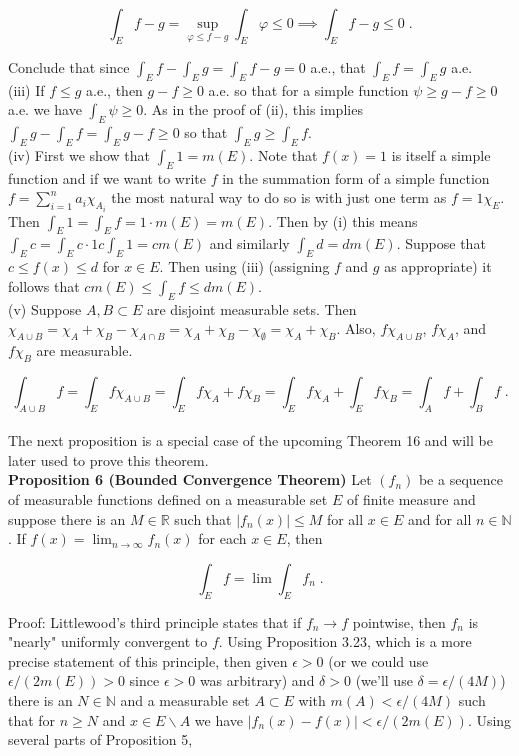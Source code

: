 \documentclass[a4paper]{article}
\begin{document}
$$\int_E f-g = \sup_{\varphi \leq f-g} \int_E \varphi \leq 0 \implies \int_E f-g \leq 0\;.$$

Conclude that since $\int_E f - \int_E g = \int_E f-g = 0$ a.e., that $\int_E f = \int_E g$ a.e.\\

(iii) If $f \leq g$ a.e., then $g-f \geq 0$ a.e. so that for a simple function $\psi \geq g-f \geq 0$ a.e. we have $\int_E \psi \geq 0$. As in the proof of (ii), this implies $\int_E g - \int_E f = \int_E g-f \geq 0$ so that $\int_E g \geq \int_E f$. \\

(iv) First we show that $\int_E 1 = m(E)$. Note that $f(x) = 1$ is itself a simple function and if we want to write $f$ in the summation form of a simple function $f = \sum_{i=1}^n a_i \chi_{A_i}$ the most natural way to do so is with just one term as $f = 1\chi_{E}$. Then $\int_E 1 = \int_E f = 1 \cdot m(E) = m(E)$. Then by (i) this means $\int_E c = \int_E c\cdot 1 c\int_E 1 = cm(E)$ and similarly $\int_E d = dm(E)$. Suppose that $c \leq f(x) \leq d$ for $x \in E$. Then using (iii) (assigning $f$ and $g$ as appropriate) it follows that $cm(E) \leq \int_E f \leq dm(E)$. \\

(v) Suppose $A,B \subset E$ are disjoint measurable sets. Then $\chi_{A\cup B} = \chi_A + \chi_B -  \chi_{A\cap B} = \chi_A + \chi_B - \chi_\emptyset = \chi_A + \chi_B$. Also, $f\chi_{A\cup B}$, $f\chi_A$, and $f\chi_B$ are measurable.

$$\int_{A\cup B} f = \int_{E} f\chi_{A\cup B} = \int_E f\chi_A + f\chi_B = \int_E f\chi_A + \int_E f\chi_B = \int_A f + \int_B f \;.$$\\

The next proposition is a special case of the upcoming Theorem 16 and will be later used to prove this theorem.\\

{\bf Proposition 6 (Bounded Convergence Theorem)} Let $(f_n)$ be a sequence of measurable functions defined on a measurable set $E$ of finite measure and suppose there is an $M \in \mathbb{R}$ such that $|f_n(x)| \leq M$ for all $x \in E$ and for all $n\in \mathbb{N}$. If $f(x) = \lim_{n\rightarrow \infty} f_n(x)$ for each $x \in E$, then 

$$\int_E f = \lim \int_E f_n \;.$$

Proof: Littlewood's third principle states that if $f_n \rightarrow f$ pointwise, then $f_n$ is "nearly" uniformly convergent to $f$. Using Proposition 3.23, which is a more precise statement of this principle, then given $\epsilon > 0$ (or we could use $\epsilon / (2m(E)) > 0$ since $\epsilon > 0$ was arbitrary) and $\delta > 0$ (we'll use $\delta = \epsilon / (4M)$) there is an $N \in \mathbb{N}$ and a measurable set $A \subset E$ with $m(A) < \epsilon / (4M)$ such that for $n \geq N$ and $x \in E\backslash A$ we have $|f_n(x) - f(x)| < \epsilon / (2m(E))$. Using several parts of Proposition 5,
\end{document}

